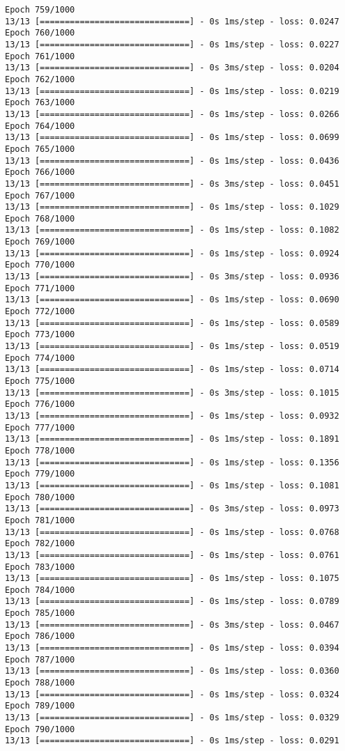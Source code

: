 \documentclass[11pt]{article}
\begin{document}
\begin{Verbatim}[commandchars=\\\{\}]
Epoch 759/1000
13/13 [==============================] - 0s 1ms/step - loss: 0.0247
Epoch 760/1000
13/13 [==============================] - 0s 1ms/step - loss: 0.0227
Epoch 761/1000
13/13 [==============================] - 0s 3ms/step - loss: 0.0204
Epoch 762/1000
13/13 [==============================] - 0s 1ms/step - loss: 0.0219
Epoch 763/1000
13/13 [==============================] - 0s 1ms/step - loss: 0.0266
Epoch 764/1000
13/13 [==============================] - 0s 1ms/step - loss: 0.0699
Epoch 765/1000
13/13 [==============================] - 0s 1ms/step - loss: 0.0436
Epoch 766/1000
13/13 [==============================] - 0s 3ms/step - loss: 0.0451
Epoch 767/1000
13/13 [==============================] - 0s 1ms/step - loss: 0.1029
Epoch 768/1000
13/13 [==============================] - 0s 1ms/step - loss: 0.1082
Epoch 769/1000
13/13 [==============================] - 0s 1ms/step - loss: 0.0924
Epoch 770/1000
13/13 [==============================] - 0s 3ms/step - loss: 0.0936
Epoch 771/1000
13/13 [==============================] - 0s 1ms/step - loss: 0.0690
Epoch 772/1000
13/13 [==============================] - 0s 1ms/step - loss: 0.0589
Epoch 773/1000
13/13 [==============================] - 0s 1ms/step - loss: 0.0519
Epoch 774/1000
13/13 [==============================] - 0s 1ms/step - loss: 0.0714
Epoch 775/1000
13/13 [==============================] - 0s 3ms/step - loss: 0.1015
Epoch 776/1000
13/13 [==============================] - 0s 1ms/step - loss: 0.0932
Epoch 777/1000
13/13 [==============================] - 0s 1ms/step - loss: 0.1891
Epoch 778/1000
13/13 [==============================] - 0s 1ms/step - loss: 0.1356
Epoch 779/1000
13/13 [==============================] - 0s 1ms/step - loss: 0.1081
Epoch 780/1000
13/13 [==============================] - 0s 3ms/step - loss: 0.0973
Epoch 781/1000
13/13 [==============================] - 0s 1ms/step - loss: 0.0768
Epoch 782/1000
13/13 [==============================] - 0s 1ms/step - loss: 0.0761
Epoch 783/1000
13/13 [==============================] - 0s 1ms/step - loss: 0.1075
Epoch 784/1000
13/13 [==============================] - 0s 1ms/step - loss: 0.0789
Epoch 785/1000
13/13 [==============================] - 0s 3ms/step - loss: 0.0467
Epoch 786/1000
13/13 [==============================] - 0s 1ms/step - loss: 0.0394
Epoch 787/1000
13/13 [==============================] - 0s 1ms/step - loss: 0.0360
Epoch 788/1000
13/13 [==============================] - 0s 1ms/step - loss: 0.0324
Epoch 789/1000
13/13 [==============================] - 0s 1ms/step - loss: 0.0329
Epoch 790/1000
13/13 [==============================] - 0s 1ms/step - loss: 0.0291

\end{Verbatim}
\end{document}
